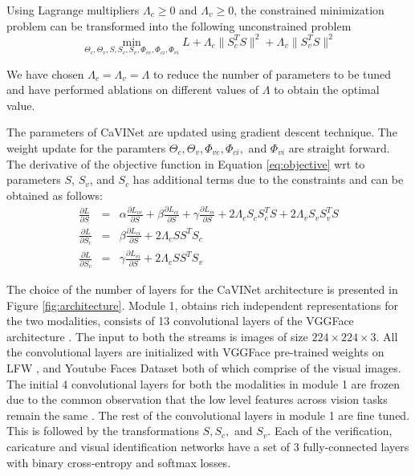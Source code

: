 Using Lagrange multipliers $\Lambda_c\geq0$ and $\Lambda_v\geq0$, the constrained minimization problem can be transformed into the following unconstrained problem 
\begin{equation}
   \min_{\Theta_c,\Theta_v, S, S_c, S_v, \Phi_{ve}, \Phi_{ci}, \Phi_{vi}} L +\Lambda_c\|S_c^TS\|^2+\Lambda_v\|S_v^TS\|^2
   \label{eq:objective}
\end{equation}

We have chosen $\Lambda_{c}=\Lambda_{v}=\Lambda$ to reduce the number of parameters to be tuned and have performed ablations on different values of $\Lambda$ to obtain the optimal value.

The parameters of CaVINet are updated using gradient descent technique. The weight update for the paramters $\Theta_c,\Theta_v, \Phi_{ve}, \Phi_{ci},$ and $\Phi_{vi}$ are straight forward. The derivative of the objective function in Equation \ref{eq:objective} wrt to parameters $S$, $S_{v}$, and $S_{c}$ has additional terms due to the constraints and can be obtained as follows:
\begin{eqnarray*}
\frac{\partial L}{\partial S} & = & \alpha \frac{\partial L_{ve}}{\partial S}+\beta \frac{\partial L_{ci}}{\partial S}+\gamma \frac{\partial L_{vi}}{\partial S}+ 2\Lambda_c S_c S_c^T S+2\Lambda_v S_v S_v^T S \\
\frac{\partial L}{\partial S_c} & = & \beta \frac{\partial L_{ci}}{\partial S} + 2\Lambda_c SS^T S_c \\
\frac{\partial L}{\partial S_v} & = & \gamma \frac{\partial L_{vi}}{\partial S} + 2\Lambda_c SS^T S_v
\end{eqnarray*}


The choice of the number of layers for the CaVINet architecture is presented in Figure \ref{fig:architecture}. Module 1, obtains rich independent representations for the two modalities, consists of 13 convolutional layers of the VGGFace architecture \cite{rw4}. The input to both the streams is images of size $224\times224\times3$. All the convolutional layers are initialized with VGGFace pre-trained weights on LFW \cite{LFWTech}, and Youtube Faces Dataset \cite{youtube} both of which comprise of the visual images. The initial 4 convolutional layers for both the modalities in module 1 are frozen due to the common observation that the low level features across vision tasks remain the same \cite{Zeiler14visualizingand}. The rest of the convolutional layers in module 1 are fine tuned. This is followed by the transformations $S, S_c,$ and $S_v$. Each of the verification, caricature and visual identification networks have a set of 3 fully-connected layers with binary cross-entropy and softmax losses.

